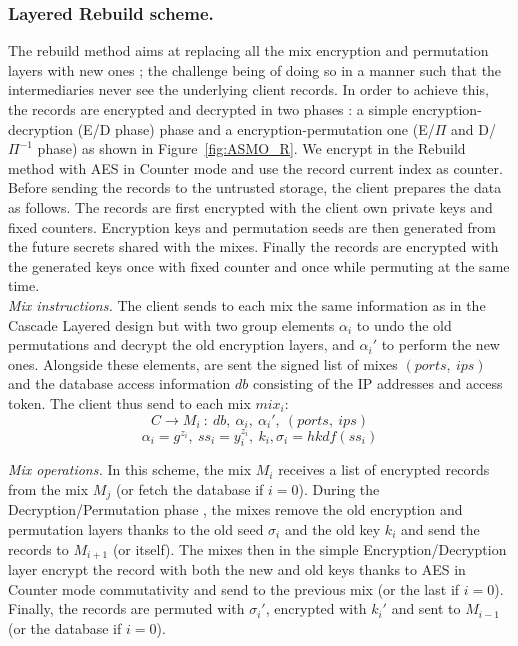 \documentclass[USenglish,oneside,twocolumn]{article}
\begin{document}
\vspace{-1cm}

\subsubsection{Layered Rebuild scheme.} 

The rebuild method aims at replacing all the mix encryption and permutation layers with new ones ; the challenge being of doing so in a manner such that the intermediaries never see the underlying client records. 
In order to achieve this, the records are encrypted and decrypted in two phases : a simple encryption-decryption (E/D phase) phase and a encryption-permutation one (E/$\Pi$ and D/$\Pi^{-1}$ phase) as shown in Figure~\ref{fig:ASMO_R}. We encrypt in the Rebuild method with AES in Counter mode and use the record current index as counter.\\

Before sending the records to the untrusted storage, the client prepares the data as follows. The records are first encrypted with the client own private keys and fixed counters. Encryption keys and permutation seeds are then generated from the future secrets shared with the mixes. Finally the records are encrypted with the generated keys once with fixed counter and once while permuting at the same time.\\

\noindent\textit{Mix instructions.}
The client sends to each mix the same information as in the Cascade Layered design but with two group elements $\alpha_{i}$ to undo the old permutations and decrypt the old encryption layers, and $\alpha_{i}'$ to perform the new ones. Alongside these elements, are sent the signed list of mixes $(ports,\ ips)$ and the database access information $db$ consisting of the IP addresses and access token. The client thus send to each mix $mix_i$:
$$C \rightarrow M_i\ :\ db,\ \alpha_{i},\ \alpha_{i}',\ (ports,\ ips) $$
$$ \alpha_i = g^{z_i},\ ss_i = y_i^{z_i},\ k_i, \sigma_i=hkdf(ss_i)$$


\noindent\textit{Mix operations.} In this scheme, the mix $M_i$ receives a list of encrypted records from the mix $M_j$ (or fetch the database if $i=0$). During the Decryption/Permutation phase , the mixes remove the old encryption and permutation layers thanks to the old seed $\sigma_{i}$ and the old key $k_{i}$ and send the records to $M_{i+1}$ (or itself). The mixes then in the simple Encryption/Decryption layer encrypt the record with both the new and old keys thanks to AES in Counter mode commutativity and send to the previous mix (or the last if $i=0$). Finally, the records are permuted with $\sigma_{i}'$, encrypted with $k_{i}'$ and sent to $M_{i-1}$ (or the database if $i=0$).\\
\end{document}
